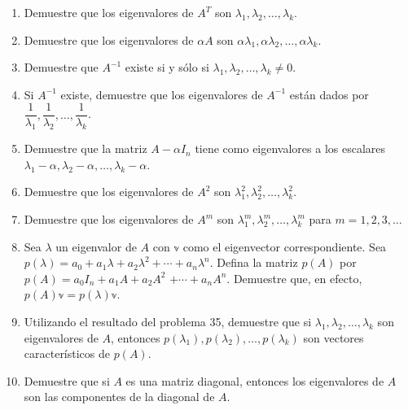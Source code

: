 \begin{enumerate}[resume]
    \item Demuestre que los eigenvalores de $A^{T}$ son $\lambda_{1}, \lambda_{2}, \dots, \lambda_{k}$.
    \item Demuestre que los eigenvalores de $\alpha A$ son $\alpha \lambda_{1}, \alpha \lambda_{2}, \dots, \alpha \lambda_{k}$.
    \item Demuestre que $A^{-1}$ existe si y sólo si $\lambda_{1}, \lambda_{2}, \dots, \lambda_{k} \neq 0$.
    \item Si $A^{-1}$ existe, demuestre que los eigenvalores de $A^{-1}$ están dados por $\dfrac{1}{\lambda_{1}}, \dfrac{1}{\lambda_{2}}, \dots, \dfrac{1}{\lambda_{k}}$.
    \item Demuestre que la matriz $A-\alpha I_n$ tiene como eigenvalores a los escalares $\lambda_{1}-\alpha, \lambda_{2}-\alpha, \dots, \lambda_{k}-\alpha$.
    \item Demuestre que los eigenvalores de $A^{2}$ son $\lambda_{1}^{2}, \lambda_{2}^{2}, \dots, \lambda_{k}^{2}$.
    \item Demuestre que los eigenvalores de $A^{m}$ son $\lambda_{1}^{m}, \lambda_{2}^{m}, \dots, \lambda_{k}^{m}$ para $m=1,2,3, \dots$
    \item Sea $\lambda$ un eigenvalor de $A$ con $\mathbb{v}$ como el eigenvector correspondiente. Sea $p(\lambda)=a_{0}+a_{1} \lambda+a_{2} \lambda^{2}+\cdots+a_{n} \lambda^{n}$. Defina la matriz $p(A)$ por $p(A)=a_{0} I_n+a_{1} A+a_{2} A^{2}$ $+\cdots+a_{n} A^{n}$. Demuestre que, en efecto, $p(A) \mathbb{v}=p(\lambda) \mathbb{v}$.
    \item Utilizando el resultado del problema 35, demuestre que si $\lambda_{1}, \lambda_{2}, \dots, \lambda_{k}$ son eigenvalores de $A$, entonces $p\left(\lambda_{1}\right), p\left(\lambda_{2}\right), \dots, p\left(\lambda_{k}\right)$ son vectores característicos de $p(A)$.
    \item Demuestre que si $A$ es una matriz diagonal, entonces los eigenvalores de $A$ son las componentes de la diagonal de $A$.

\end{enumerate}
